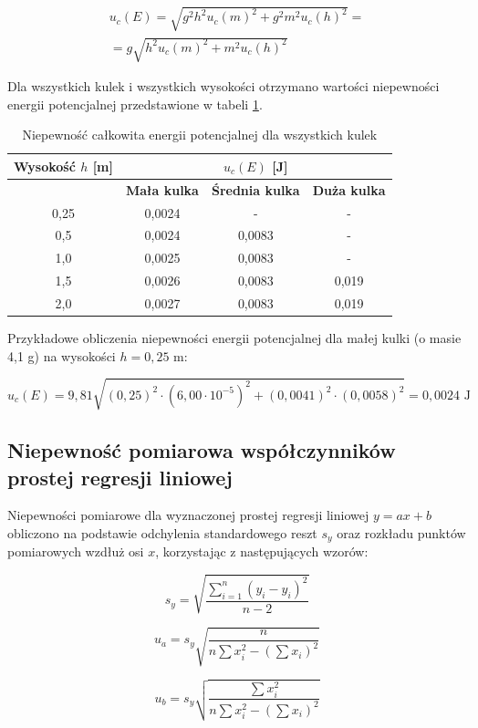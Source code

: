 \documentclass[a4paper,12pt]{article}
\begin{document}
\begin{align*}
u_c(E) = \sqrt{g^2h^2 u_c(m)^2 + g^2m^2 u_c(h)^2} = \\
= g\sqrt{h^2u_c(m)^2 + m^2u_c(h)^2}
\end{align*}

Dla wszystkich kulek i wszystkich wysokości otrzymano wartości niepewności energii potencjalnej przedstawione w tabeli \ref{tab:niepewnosc_calkowita_energii}.

\begin{table}[H]
\centering
\begin{tabular}{|c|c|c|c|}
\hline
\textbf{Wysokość $h$ [m]} & \multicolumn{3}{c|}{\textbf{$u_c(E)$ [J]}} \\
\hline
& \textbf{Mała kulka} & \textbf{Średnia kulka} & \textbf{Duża kulka} \\
\hline
0,25 & 0,0024 & - & - \\
\hline
0,5 & 0,0024 & 0,0083 & - \\
\hline
1,0 & 0,0025 & 0,0083 & - \\
\hline
1,5 & 0,0026 & 0,0083 & 0,019 \\
\hline
2,0 & 0,0027 & 0,0083 & 0,019 \\
\hline
\end{tabular}
\caption{Niepewność całkowita energii potencjalnej dla wszystkich kulek}
\label{tab:niepewnosc_calkowita_energii}
\end{table}

Przykładowe obliczenia niepewności energii potencjalnej dla małej kulki (o masie 4,1 g) na wysokości $h = 0,25$ m:

$$
u_c(E) = 9,81 \sqrt{(0,25)^2 \cdot (6,00\cdot10^{-5})^2 + (0,0041)^2 \cdot (0,0058)^2} = 0,0024 \text{ J}
$$


\subsection{Niepewność pomiarowa współczynników prostej regresji liniowej}

Niepewności pomiarowe dla wyznaczonej prostej regresji liniowej $y = ax + b$ obliczono na podstawie odchylenia standardowego reszt $s_y$ oraz rozkładu punktów pomiarowych wzdłuż osi $x$, korzystając z następujących wzorów:

\[
s_y = \sqrt{\frac{\sum_{i=1}^{n} (y_i - \hat{y}_i)^2}{n-2}}
\]

\[
u_a = s_y \sqrt{\frac{n}{n \sum x_i^2 - \left( \sum x_i \right)^2}}
\]

\[
u_b = s_y \sqrt{\frac{\sum x_i^2}{n \sum x_i^2 - \left( \sum x_i \right)^2}}
\]
\end{document}
